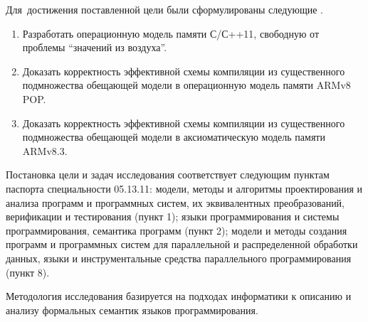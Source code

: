 Для~достижения поставленной цели были сформулированы следующие {\tasks}.
\begin{enumerate}
  \item Разработать операционную модель памяти С/С++11, свободную от проблемы ``значений из воздуха''.
  \item Доказать корректность эффективной схемы компиляции из существенного подмножества обещающей модели в операционную модель памяти ARMv8 POP.
  \item Доказать корректность эффективной схемы компиляции из существенного подмножества обещающей модели в аксиоматическую модель памяти ARMv8.3.
\end{enumerate}

Постановка цели и задач исследования соответствует следующим пунктам паспорта специальности 05.13.11:
модели, методы и алгоритмы проектирования и анализа программ и программных систем, их эквивалентных преобразований, верификации и тестирования (пункт 1);
языки программирования и системы программирования, семантика программ (пункт 2);
модели и методы создания программ и программных систем для параллельной и распределенной обработки данных,
языки и инструментальные средства параллельного программирования (пункт 8).

{\methods}
Методология исследования базируется на подходах информатики
к описанию и анализу формальных семантик языков программирования.


